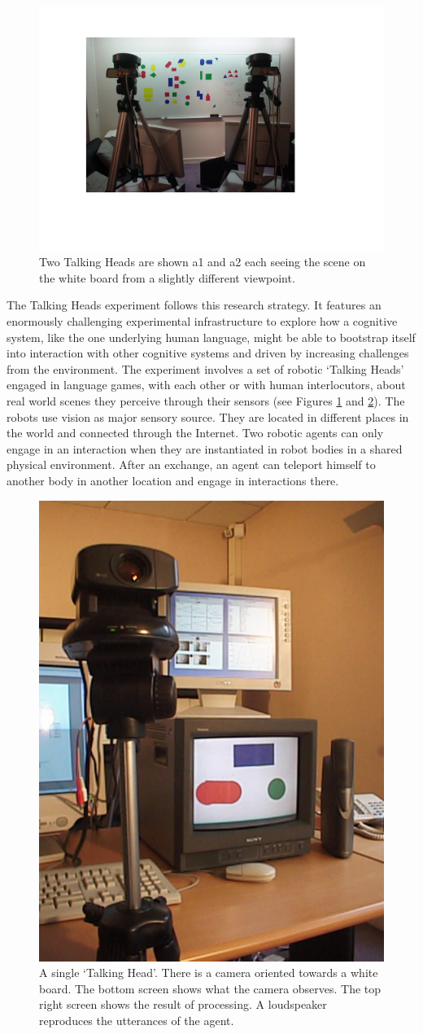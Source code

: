\begin{figure}[htbp]
  \centerline{\includegraphics[width=.65\textwidth]{chap1/figs/heads}}
\caption{Two Talking Heads are shown {\bfshape a1} and 
{\bfshape a2} each seeing the scene on the white board from a slightly different viewpoint.}
\label{f:plate1}
\end{figure}

The Talking Heads experiment follows this research strategy. 
It features an enormously challenging experimental
infrastructure to explore how a cognitive
system, like the one underlying human language, might
be able to bootstrap itself into interaction 
with other cognitive systems and driven by increasing
challenges from the environment. The experiment
involves a set of robotic `Talking Heads' engaged in language
games, with each other or with human interlocutors, 
about real world scenes they perceive through their sensors
(see Figures \ref{f:plate1} and \ref{f:plate2}). 
The robots use vision as major sensory source. They are located in
different places in the world and connected through the Internet. 
Two robotic agents can only engage in an interaction when they 
are instantiated in robot bodies in a shared physical environment. 
After an exchange, an agent can teleport himself to another body in 
another location and engage in interactions there. 


\begin{figure}[htbp]
  \centerline{\includegraphics[width=.40\textwidth]{chap1/figs/head}}
\caption{ A single `Talking Head'. There is a camera oriented towards a
white board. The bottom screen shows what the camera observes. The top right screen shows the result of processing.
A loudspeaker reproduces the utterances of the agent. }
\label{f:plate2}
\end{figure}

